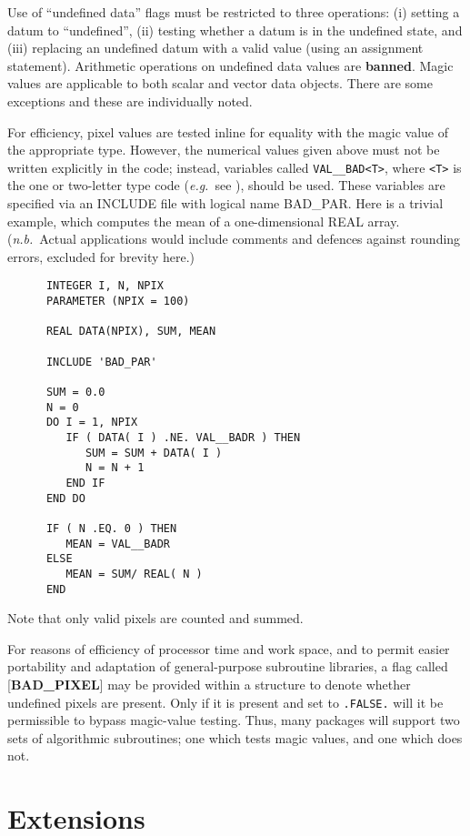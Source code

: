Use of ``undefined data'' flags must be restricted to three operations:
(i) setting a datum to ``undefined'', (ii) testing whether a datum is
in the undefined state, and (iii) replacing an undefined datum with a
valid value (using an assignment statement).  Arithmetic operations on
undefined data values are {\bf banned}.  Magic values are applicable to both
scalar and vector data objects.  There are some exceptions and these
are individually noted.

For efficiency, pixel values are tested inline for equality with the
magic value of the appropriate type.  However, the numerical values
given above must not be written explicitly in the code; instead,
variables called {\tt VAL\_\_BAD<T>}, where {\tt <T>} is the one or two-letter
type code ({\it e.g.}\  see ), should
be used.  These variables are specified
via an INCLUDE file with logical name BAD\_PAR.  Here is a trivial
example, which computes the mean of a one-dimensional REAL array.
({\it n.b.}\ Actual applications would include comments and
defences against rounding errors, excluded for brevity here.)

\goodbreak
\begin{verbatim}
      INTEGER I, N, NPIX
      PARAMETER (NPIX = 100)

      REAL DATA(NPIX), SUM, MEAN

      INCLUDE 'BAD_PAR'

      SUM = 0.0
      N = 0
      DO I = 1, NPIX
         IF ( DATA( I ) .NE. VAL__BADR ) THEN
            SUM = SUM + DATA( I )
            N = N + 1
         END IF
      END DO

      IF ( N .EQ. 0 ) THEN
         MEAN = VAL__BADR
      ELSE
         MEAN = SUM/ REAL( N )
      END
\end{verbatim}

Note that only valid pixels are counted and summed.

For reasons of efficiency of processor time and work space, and to
permit easier portability and adaptation of general-purpose subroutine
libraries, a flag called {[}{\bf BAD\_PIXEL}{]} may be
provided within a structure
to denote whether undefined pixels are present.  Only if it is present
and set to {\tt .FALSE.} will it be
permissible to bypass magic-value testing.  Thus, many packages
will support two sets of algorithmic subroutines; one which
tests magic values, and one which does not. 

\section{Extensions\label{se:exten}}

